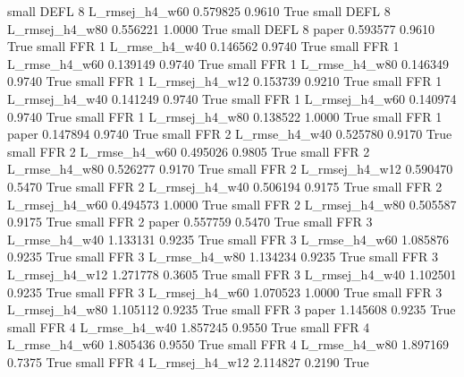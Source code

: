      small     DEFL                 8 L_rmsej_h4_w60   0.579825      0.9610    True
     small     DEFL                 8 L_rmsej_h4_w80   0.556221      1.0000    True
     small     DEFL                 8          paper   0.593577      0.9610    True
     small      FFR                 1  L_rmse_h4_w40   0.146562      0.9740    True
     small      FFR                 1  L_rmse_h4_w60   0.139149      0.9740    True
     small      FFR                 1  L_rmse_h4_w80   0.146349      0.9740    True
     small      FFR                 1 L_rmsej_h4_w12   0.153739      0.9210    True
     small      FFR                 1 L_rmsej_h4_w40   0.141249      0.9740    True
     small      FFR                 1 L_rmsej_h4_w60   0.140974      0.9740    True
     small      FFR                 1 L_rmsej_h4_w80   0.138522      1.0000    True
     small      FFR                 1          paper   0.147894      0.9740    True
     small      FFR                 2  L_rmse_h4_w40   0.525780      0.9170    True
     small      FFR                 2  L_rmse_h4_w60   0.495026      0.9805    True
     small      FFR                 2  L_rmse_h4_w80   0.526277      0.9170    True
     small      FFR                 2 L_rmsej_h4_w12   0.590470      0.5470    True
     small      FFR                 2 L_rmsej_h4_w40   0.506194      0.9175    True
     small      FFR                 2 L_rmsej_h4_w60   0.494573      1.0000    True
     small      FFR                 2 L_rmsej_h4_w80   0.505587      0.9175    True
     small      FFR                 2          paper   0.557759      0.5470    True
     small      FFR                 3  L_rmse_h4_w40   1.133131      0.9235    True
     small      FFR                 3  L_rmse_h4_w60   1.085876      0.9235    True
     small      FFR                 3  L_rmse_h4_w80   1.134234      0.9235    True
     small      FFR                 3 L_rmsej_h4_w12   1.271778      0.3605    True
     small      FFR                 3 L_rmsej_h4_w40   1.102501      0.9235    True
     small      FFR                 3 L_rmsej_h4_w60   1.070523      1.0000    True
     small      FFR                 3 L_rmsej_h4_w80   1.105112      0.9235    True
     small      FFR                 3          paper   1.145608      0.9235    True
     small      FFR                 4  L_rmse_h4_w40   1.857245      0.9550    True
     small      FFR                 4  L_rmse_h4_w60   1.805436      0.9550    True
     small      FFR                 4  L_rmse_h4_w80   1.897169      0.7375    True
     small      FFR                 4 L_rmsej_h4_w12   2.114827      0.2190    True
